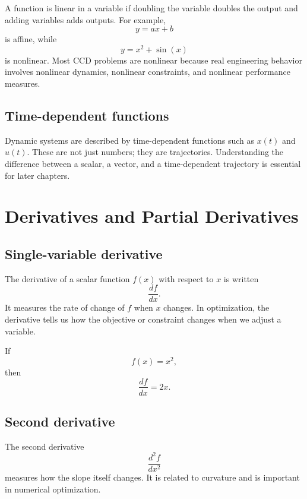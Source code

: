 \documentclass[11pt]{article}
\begin{document}
A function is linear in a variable if doubling the variable doubles the output and adding variables adds outputs. For example,
\begin{equation}
 y = ax+b
\end{equation}
is affine, while
\begin{equation}
 y=x^2+\sin(x)
\end{equation}
is nonlinear. Most CCD problems are nonlinear because real engineering behavior involves nonlinear dynamics, nonlinear constraints, and nonlinear performance measures.

\subsection{Time-dependent functions}

Dynamic systems are described by time-dependent functions such as $x(t)$ and $u(t)$. These are not just numbers; they are trajectories. Understanding the difference between a scalar, a vector, and a time-dependent trajectory is essential for later chapters.

\section{Derivatives and Partial Derivatives}

\subsection{Single-variable derivative}

The derivative of a scalar function $f(x)$ with respect to $x$ is written
\begin{equation}
\frac{df}{dx}.
\end{equation}
It measures the rate of change of $f$ when $x$ changes. In optimization, the derivative tells us how the objective or constraint changes when we adjust a variable.

If
\begin{equation}
f(x)=x^2,
\end{equation}
then
\begin{equation}
\frac{df}{dx}=2x.
\end{equation}

\subsection{Second derivative}

The second derivative
\begin{equation}
\frac{d^2 f}{dx^2}
\end{equation}
measures how the slope itself changes. It is related to curvature and is important in numerical optimization.
\end{document}
